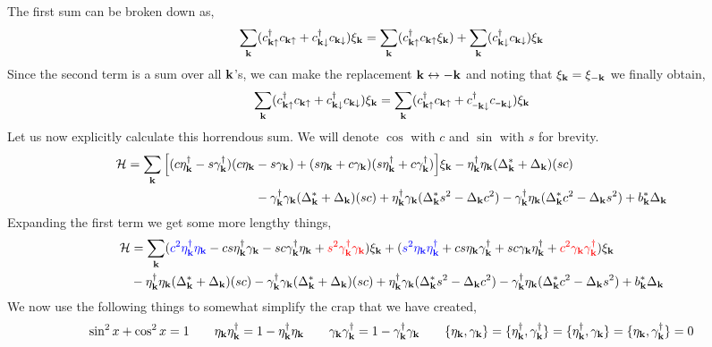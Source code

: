 \documentclass{article}
\newcommand{\SH}{\mathcal{H}}
\newcommand{\vk}{\vb{k}}
\newcommand{\sm}{\mathord{\scalebox{0.6}[1]{$-$}}}
\newcommand{\kup}{\vk\uparrow}
\newcommand{\kdown}{\sm\vk\downarrow}
\newcommand{\ek}{\eta_{\vk}}
\newcommand{\gk}{\gamma_{\vk}}
\begin{document}
The first sum can be broken down as,
\begin{equation}
   \sum\limits_{\vk} ( c_{\kup}^\dagger c_{\kup} + c_{\vk\downarrow}^\dagger c_{\vk\downarrow})\xi_{\vk} = \sum\limits_{\vk} ( c_{\kup}^\dagger c_{\kup}\xi_{\vk}) +\sum\limits_{\vk} (c_{\vk\downarrow}^\dagger c_{\vk\downarrow})\xi_{\vk}
\end{equation}
Since the second term is a sum over all $\vk$'s, we can make the replacement $\vk \leftrightarrow -\vk$ and noting that $\xi_{\vk} = \xi_{-\vk}$ we finally obtain,
\begin{equation}
     \sum\limits_{\vk} ( c_{\kup}^\dagger c_{\kup} + c_{\vk\downarrow}^\dagger c_{\vk\downarrow})\xi_{\vk} =  \sum\limits_{\vk} ( c_{\kup}^\dagger c_{\kup} + c_{\kdown}^\dagger c_{\kdown})\xi_{\vk}
\end{equation}
Let us now explicitly calculate this horrendous sum. We will denote $\cos$ with $c$ and $\sin$ with $s$ for brevity.
\begin{align}
    \begin{split}
        \SH =\sum\limits_{\vk} \Big[(c\ek^\dagger -s\gk^\dagger)(c\ek &-s\gk) + (s\ek +c\gk)(s\ek^\dagger +c\gk^\dagger)\Big]\xi_{\vk}-\ek^\dagger\ek (\Delta_{\vk}^*+\Delta_{\vk})(sc)\\
& -\gk^\dagger\gk (\Delta_{\vk}^*+\Delta_{\vk})(sc) +\ek^\dagger\gk (\Delta_{\vk}^*s^2-\Delta_{\vk}c^2) -\gk^\dagger\ek (\Delta_{\vk}^*c^2-\Delta_{\vk}s^2)+ b_{\vk}^*\Delta_{\vk}
    \end{split}
\end{align}
Expanding the first term we get some more lengthy things, 
\begin{align}
    \begin{split}
        \SH &=\sum\limits_{\vk} (\mathcolor{blue}{c^2\ek^\dagger\ek} - cs \ek^\dagger\gk - sc \gk^\dagger\ek +\mathcolor{red}{s^2 \gk^\dagger\gk})\xi_{\vk} +(\mathcolor{blue}{s^2\ek\ek^\dagger} +cs \ek\gk^\dagger + sc \gk\ek^\dagger+\mathcolor{red}{c^2\gk\gk^\dagger})\xi_{\vk}\\
        &-\ek^\dagger\ek (\Delta_{\vk}^*+\Delta_{\vk})(sc)-\gk^\dagger\gk (\Delta_{\vk}^*+\Delta_{\vk})(sc) +\ek^\dagger\gk (\Delta_{\vk}^*s^2-\Delta_{\vk}c^2) -\gk^\dagger\ek (\Delta_{\vk}^*c^2-\Delta_{\vk}s^2)+ b_{\vk}^*\Delta_{\vk}
    \end{split}
\end{align}
We now use the following things to somewhat simplify the crap that we have created,
$$\sin^2x + \cos^2x=1 \qquad \ek\ek^\dagger = 1- \ek^\dagger\ek \qquad \gk\gk^\dagger = 1- \gk^\dagger\gk\qquad \{\ek,\gk\}=\{\ek^\dagger,\gk^\dagger\}=\{\ek^\dagger,\gk\}=\{\ek,\gk^\dagger\}=0$$
\end{document}

